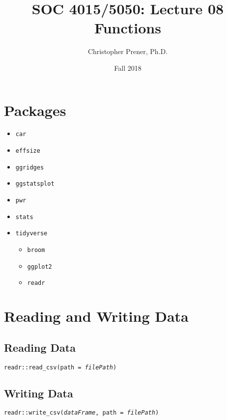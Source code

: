 \documentclass{tufte-handout}
\title{SOC 4015/5050: Lecture 08 Functions}
\author{Christopher Prener, Ph.D.}
\date{Fall 2018}
\newenvironment{subs}
  {\adjustwidth{3em}{0pt}}
  {\endadjustwidth}
\begin{document}
\maketitle %

\vspace{5mm}
\section{Packages}
\begin{itemize}
\item \texttt{car}
\item \texttt{effsize}
\item \texttt{ggridges}
\item \texttt{ggstatsplot}
\item \texttt{pwr}
\item \texttt{stats}
\item \texttt{tidyverse}
\begin{itemize}
\item \texttt{broom}
\item \texttt{ggplot2}
\item \texttt{readr}
\end{itemize}
\end{itemize}

\vspace{5mm}
\section{Reading and Writing Data}
\begin{subs}
\subsection{Reading Data}
\noindent \texttt{readr::}{\color{red}\texttt{read\_csv}}\texttt{(path = \textit{filePath})}\\

\vspace{3mm}
\subsection{Writing Data}
\noindent \texttt{readr::}{\color{red}\texttt{write\_csv}}\texttt{(\textit{dataFrame}, path = \textit{filePath})}\\
\end{subs}
\end{document}
